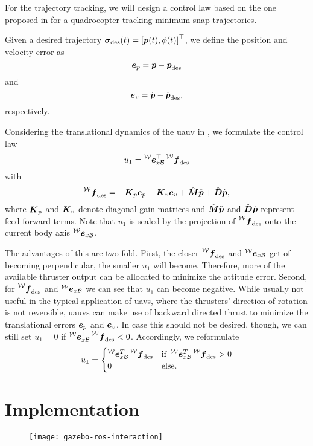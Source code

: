 For the trajectory tracking, we will design a control law based on the one proposed in \cite{MellingerKumar11} for a quadrocopter tracking minimum snap trajectories.

Given a desired trajectory $\bm{\sigma}_{\text{des}}(t) = \left[\mbox{$\bm{p}$}(t), \phi(t)\right]^\top$, we define the position and velocity error as
\begin{equation}
	\mbox{$\bm{e}$}_{p} = \mbox{$\bm{p}$} - \mbox{$\bm{p}$}_{\text{des}}
\end{equation}
and
\begin{equation}
	\mbox{$\bm{e}$}_{v} = \mbox{$\dot{\bm{p}}$} - \mbox{$\dot{\bm{p}}$}_{\text{des}}
	,
\end{equation}
respectively.

Considering the translational dynamics of the \ac{uauv} in , we formulate the control law
\begin{equation}
	\label{eq:translational-control-law-short}
	u_1 = \exbodyinworld^\top \thrustdesiredworld
\end{equation}
with
\begin{equation}
	\thrustdesiredworld =
	-\Kb_p \eb_p
	- \Kb_v \eb_v
	+ \hat{\bm{M}} \pbpp
	+ \hat{\bm{D}} \pbp
	,
\end{equation}
where $\mbox{$\bm{K}$}_p$ and $\mbox{$\bm{K}$}_v$ denote diagonal gain matrices and $\hat{\bm{M}} \mbox{$\ddot{\bm{p}}$}$ and $\hat{\bm{D}}\mbox{$\dot{\bm{p}}$}$ represent feed forward terms. Note that $u_1$ is scaled by the projection of $\thrustdesiredworld$ onto the current body axis $\prescript{\mathcal{W}}{}{\mbox{$\bm{e}$}}_{x\mathcal{B}}$.

The advantages of this are two-fold. First, the closer $\thrustdesiredworld$ and $\prescript{\mathcal{W}}{}{\mbox{$\bm{e}$}}_{x\mathcal{B}}$ get of becoming perpendicular, the smaller $u_1$ will become. Therefore, more of the available thruster output can be allocated to minimize the attitude error. Second, for $\thrustdesiredworld$ and $\prescript{\mathcal{W}}{}{\mbox{$\bm{e}$}}_{x\mathcal{B}}$ we can see that $u_1$ can become negative. While usually not useful in the typical application of \acp{uav}, where the thrusters' direction of rotation is not reversible, \acp{uauv} can make use of backward directed thrust to minimize the translational errors $\mbox{$\bm{e}$}_p$ and $\mbox{$\bm{e}$}_v$. In case this should not be desired, though, we can still set $u_1=0$ if $\exbodyinworld^\top \thrustdesiredworld < 0$. Accordingly, we reformulate 
\begin{equation}
	u_1 = 
	\begin{cases}
		\exbodyinworld^T \thrustdesiredworld & \text{if } \exbodyinworld^T \thrustdesiredworld > 0 \\
		0 & \text{else.}
	\end{cases}
\end{equation}




\section{Implementation}
\begin{figure}
	\centering
	\texttt{[image: gazebo-ros-interaction]}
\end{figure}
\label{sec:implementation}
